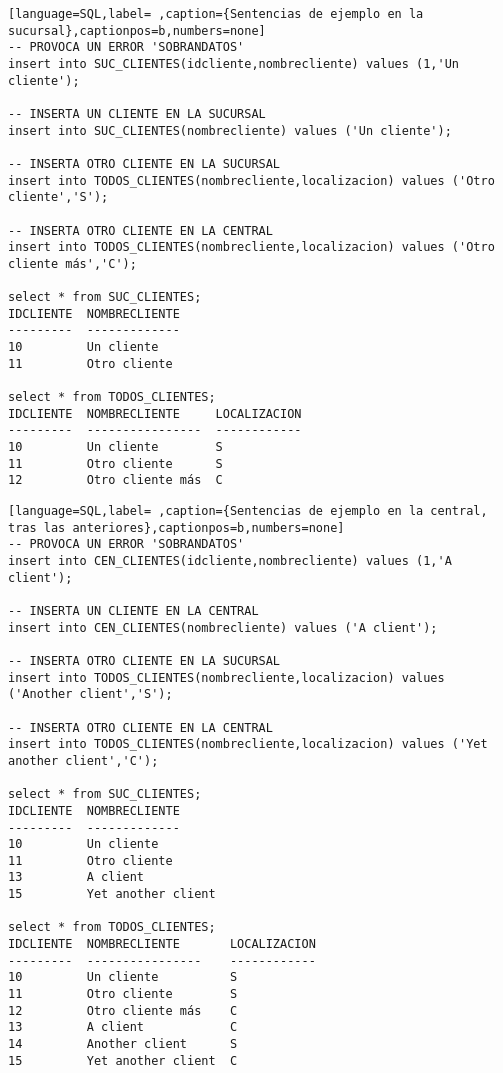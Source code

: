 \documentclass[a4paper]{article}
\begin{document}
\begin{lstlisting}[language=SQL,label= ,caption={Sentencias de ejemplo en la sucursal},captionpos=b,numbers=none]
-- PROVOCA UN ERROR 'SOBRANDATOS'
insert into SUC_CLIENTES(idcliente,nombrecliente) values (1,'Un cliente');

-- INSERTA UN CLIENTE EN LA SUCURSAL
insert into SUC_CLIENTES(nombrecliente) values ('Un cliente');

-- INSERTA OTRO CLIENTE EN LA SUCURSAL
insert into TODOS_CLIENTES(nombrecliente,localizacion) values ('Otro cliente','S');

-- INSERTA OTRO CLIENTE EN LA CENTRAL
insert into TODOS_CLIENTES(nombrecliente,localizacion) values ('Otro cliente más','C');

select * from SUC_CLIENTES;
IDCLIENTE  NOMBRECLIENTE
---------  -------------
10         Un cliente
11         Otro cliente

select * from TODOS_CLIENTES;
IDCLIENTE  NOMBRECLIENTE     LOCALIZACION
---------  ----------------  ------------
10         Un cliente        S
11         Otro cliente      S
12         Otro cliente más  C
\end{lstlisting}

\begin{lstlisting}[language=SQL,label= ,caption={Sentencias de ejemplo en la central, tras las anteriores},captionpos=b,numbers=none]
-- PROVOCA UN ERROR 'SOBRANDATOS'
insert into CEN_CLIENTES(idcliente,nombrecliente) values (1,'A client');

-- INSERTA UN CLIENTE EN LA CENTRAL
insert into CEN_CLIENTES(nombrecliente) values ('A client');

-- INSERTA OTRO CLIENTE EN LA SUCURSAL
insert into TODOS_CLIENTES(nombrecliente,localizacion) values ('Another client','S');

-- INSERTA OTRO CLIENTE EN LA CENTRAL
insert into TODOS_CLIENTES(nombrecliente,localizacion) values ('Yet another client','C');

select * from SUC_CLIENTES;
IDCLIENTE  NOMBRECLIENTE
---------  -------------
10         Un cliente
11         Otro cliente
13         A client
15         Yet another client

select * from TODOS_CLIENTES;
IDCLIENTE  NOMBRECLIENTE       LOCALIZACION
---------  ----------------    ------------
10         Un cliente          S
11         Otro cliente        S
12         Otro cliente más    C
13         A client            C
14         Another client      S
15         Yet another client  C
\end{lstlisting}
\end{document}
